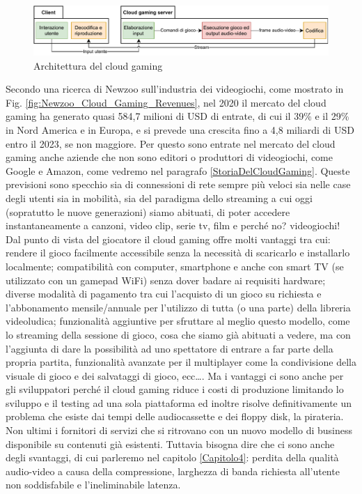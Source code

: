 \begin{figure}[H]
	\includegraphics[width=\linewidth]{immagini/cloud_gaming_general_scheme}
	\caption{Architettura del cloud gaming}
	\label{fig:cloud_gaming_general_scheme}
\end{figure}

Secondo una ricerca di Newzoo sull'industria dei videogiochi, come mostrato in Fig. \ref{fig:Newzoo_Cloud_Gaming_Revenues}, nel 2020 il mercato del cloud gaming ha generato quasi 584,7 milioni di USD di entrate, di cui il 39\% e il 29\% in Nord America e in Europa, e si prevede una crescita fino a 4,8 miliardi di USD entro il 2023, se non maggiore. Per questo sono entrate nel mercato del cloud gaming anche aziende che non sono editori o produttori di videogiochi, come Google e Amazon, come vedremo nel paragrafo \ref{StoriaDelCloudGaming}. Queste previsioni sono specchio sia di connessioni di rete sempre più veloci sia nelle case degli utenti sia in mobilità, sia del paradigma dello streaming a cui oggi (sopratutto le nuove generazioni) siamo abituati, di poter accedere instantaneamente a canzoni, video clip, serie tv, film e perché no? videogiochi! Dal punto di vista del giocatore il cloud gaming offre molti vantaggi tra cui: rendere il gioco facilmente accessibile senza la necessità di scaricarlo e installarlo localmente; compatibilità con computer, smartphone e anche con smart TV (se utilizzato con un gamepad WiFi) senza dover badare ai requisiti hardware; diverse modalità di pagamento tra cui l'acquisto di un gioco su richiesta e l'abbonamento mensile/annuale per l'utilizzo di tutta (o una parte) della libreria videoludica; funzionalità aggiuntive per sfruttare al meglio questo modello, come lo streaming della sessione di gioco, cosa che siamo già abituati a vedere, ma con l'aggiunta di dare la possibilità ad uno spettatore di entrare a far parte della propria partita, funzionalità avanzate per il multiplayer come la condivisione della visuale di gioco e dei salvataggi di gioco, ecc\dots. Ma i vantaggi ci sono anche per gli sviluppatori perché il cloud gaming riduce i costi di produzione limitando lo sviluppo e il testing ad una sola piattaforma ed inoltre risolve definitivamente un problema che esiste dai tempi delle audiocassette e dei floppy disk, la pirateria. Non ultimi i fornitori di servizi che si ritrovano con un nuovo modello di business disponibile su contenuti già esistenti. Tuttavia bisogna dire che ci sono anche degli svantaggi, di cui parleremo nel capitolo \ref{Capitolo4}: perdita della qualità audio-video a causa della compressione, larghezza di banda richiesta all'utente non soddisfabile e l'ineliminabile latenza.

